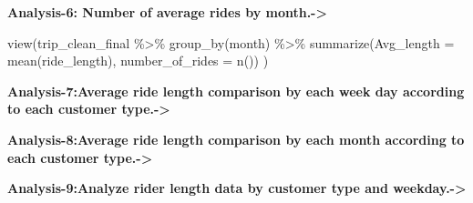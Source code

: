 \documentclass[
]{article}
\newenvironment{Shaded}{\begin{snugshade}}{\end{snugshade}}
\newcommand{\AttributeTok}[1]{\textcolor[rgb]{0.77,0.63,0.00}{#1}}
\newcommand{\FunctionTok}[1]{\textcolor[rgb]{0.00,0.00,0.00}{#1}}
\newcommand{\NormalTok}[1]{#1}
\newcommand{\SpecialCharTok}[1]{\textcolor[rgb]{0.00,0.00,0.00}{#1}}
\begin{document}
\textbf{Analysis-6: Number of average rides by month.-\textgreater{}}

\begin{Shaded}
\begin{Highlighting}[]
\FunctionTok{view}\NormalTok{(trip\_clean\_final }\SpecialCharTok{\%\textgreater{}\%} 
       \FunctionTok{group\_by}\NormalTok{(month) }\SpecialCharTok{\%\textgreater{}\%} 
       \FunctionTok{summarize}\NormalTok{(}\AttributeTok{Avg\_length =} \FunctionTok{mean}\NormalTok{(ride\_length),}
                 \AttributeTok{number\_of\_rides =} \FunctionTok{n}\NormalTok{())}
\NormalTok{)}
\end{Highlighting}
\end{Shaded}

\textbf{Analysis-7:Average ride length comparison by each week day
according to each customer type.-\textgreater{}}

\begin{Shaded}
\end{Shaded}

\textbf{Analysis-8:Average ride length comparison by each month
according to each customer type.-\textgreater{}}

\begin{Shaded}
\end{Shaded}

\textbf{Analysis-9:Analyze rider length data by customer type and
weekday.-\textgreater{}}
\end{document}
